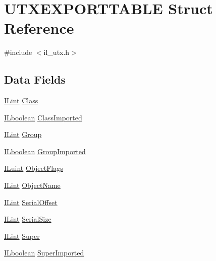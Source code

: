 \hypertarget{struct_u_t_x_e_x_p_o_r_t_t_a_b_l_e}{\section{U\-T\-X\-E\-X\-P\-O\-R\-T\-T\-A\-B\-L\-E Struct Reference}
\label{struct_u_t_x_e_x_p_o_r_t_t_a_b_l_e}
}


{\ttfamily \#include $<$il\-\_\-utx.\-h$>$}

\subsection*{Data Fields}
\begin{DoxyCompactItemize}
\item 
\hyperlink{il_8h_a288a97fb9e92e707a60b749d0039fafe}{I\-Lint} \hyperlink{struct_u_t_x_e_x_p_o_r_t_t_a_b_l_e_ac69ccda662b89a0a4db32b9132a5bae9}{Class}
\item 
\hyperlink{il_8h_a8be80d75c2c636b9f2250fe10c2e7874}{I\-Lboolean} \hyperlink{struct_u_t_x_e_x_p_o_r_t_t_a_b_l_e_a763aba4a70afd746b48fe9d38b3b65e8}{Class\-Imported}
\item 
\hyperlink{il_8h_a288a97fb9e92e707a60b749d0039fafe}{I\-Lint} \hyperlink{struct_u_t_x_e_x_p_o_r_t_t_a_b_l_e_aa016ecb2fa17dd191d2eddcfd30b6d29}{Group}
\item 
\hyperlink{il_8h_a8be80d75c2c636b9f2250fe10c2e7874}{I\-Lboolean} \hyperlink{struct_u_t_x_e_x_p_o_r_t_t_a_b_l_e_a35579995b8288f9ce83644f1975b66e1}{Group\-Imported}
\item 
\hyperlink{il_8h_ac6508d0e9c19e32f32e00d54b5b8cf30}{I\-Luint} \hyperlink{struct_u_t_x_e_x_p_o_r_t_t_a_b_l_e_a102d9baafdcb2d5c8487d81eccd1f9e9}{Object\-Flags}
\item 
\hyperlink{il_8h_a288a97fb9e92e707a60b749d0039fafe}{I\-Lint} \hyperlink{struct_u_t_x_e_x_p_o_r_t_t_a_b_l_e_add03264ed039d8c3724a94a83f6901ae}{Object\-Name}
\item 
\hyperlink{il_8h_a288a97fb9e92e707a60b749d0039fafe}{I\-Lint} \hyperlink{struct_u_t_x_e_x_p_o_r_t_t_a_b_l_e_a87b18cfe160d72032b50f184999eb926}{Serial\-Offset}
\item 
\hyperlink{il_8h_a288a97fb9e92e707a60b749d0039fafe}{I\-Lint} \hyperlink{struct_u_t_x_e_x_p_o_r_t_t_a_b_l_e_ac0c558f4b4e138ee73f27f325591928f}{Serial\-Size}
\item 
\hyperlink{il_8h_a288a97fb9e92e707a60b749d0039fafe}{I\-Lint} \hyperlink{struct_u_t_x_e_x_p_o_r_t_t_a_b_l_e_aa2d9649d316315432ddd4a4bd38d395c}{Super}
\item 
\hyperlink{il_8h_a8be80d75c2c636b9f2250fe10c2e7874}{I\-Lboolean} \hyperlink{struct_u_t_x_e_x_p_o_r_t_t_a_b_l_e_ac76c32d909fe1667ebfd61703b28b8bf}{Super\-Imported}
\end{DoxyCompactItemize}


